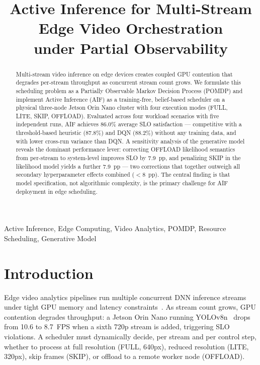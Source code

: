 \documentclass[conference]{IEEEtran}
\title{Active Inference for Multi-Stream Edge Video Orchestration\\
under Partial Observability}
\author{
\IEEEauthorblockN{Daniel Wang}
\IEEEauthorblockA{\textit{TU Wien}\\
Vienna, Austria\\
daniel.wang@tuwien.ac.at}
\and
\IEEEauthorblockN{Schahram Dustdar}
\IEEEauthorblockA{\textit{TU Wien}\\
Vienna, Austria\\
dustdar@dsg.tuwien.ac.at}
}
\begin{document}
\maketitle
\pagestyle{plain}

\begin{abstract}
Multi-stream video inference on edge devices creates coupled GPU contention that degrades per-stream throughput as concurrent stream count grows.
We formulate this scheduling problem as a Partially Observable Markov Decision Process (POMDP) and implement Active Inference (AIF) as a training-free, belief-based scheduler on a physical three-node Jetson Orin Nano cluster with four execution modes (FULL, LITE, SKIP, OFFLOAD).
Evaluated across four workload scenarios with five independent runs, AIF achieves 86.0\% average SLO satisfaction — competitive with a threshold-based heuristic (87.8\%) and DQN (88.2\%) without any training data, and with lower cross-run variance than DQN.
A sensitivity analysis of the generative model reveals the dominant performance lever: correcting OFFLOAD likelihood semantics from per-stream to system-level improves SLO by 7.9~pp, and penalizing SKIP in the likelihood model yields a further 7.9~pp — two corrections that together outweigh all secondary hyperparameter effects combined ($<$8~pp).
The central finding is that model specification, not algorithmic complexity, is the primary challenge for AIF deployment in edge scheduling.
\end{abstract}

\begin{IEEEkeywords}
Active Inference, Edge Computing, Video Analytics, POMDP, Resource Scheduling, Generative Model
\end{IEEEkeywords}

\section{Introduction}
\label{sec:introduction}

Edge video analytics pipelines run multiple concurrent DNN inference streams under tight GPU memory and latency constraints~\cite{ananthanarayanan2017real}.
As stream count grows, GPU contention degrades throughput: a Jetson Orin Nano running YOLOv8n~\cite{jocher2023yolov8} drops from 10.6 to 8.7~FPS when a sixth 720p stream is added, triggering SLO violations.
A scheduler must dynamically decide, per stream and per control step, whether to process at full resolution (FULL, 640px), reduced resolution (LITE, 320px), skip frames (SKIP), or offload to a remote worker node (OFFLOAD).
\end{document}
